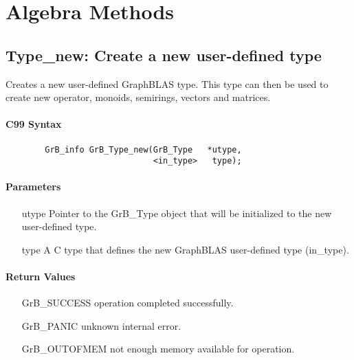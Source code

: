 \section{Algebra Methods}
\label{Sec:AlgebraMethods}



\subsection{{\sf Type\_new}: Create a new user-defined type}

Creates a new user-defined GraphBLAS type. This type can then be used to create new
operator, monoids, semirings, vectors and matrices.

\paragraph{C99 Syntax}

\begin{verbatim}
        GrB_info GrB_Type_new(GrB_Type	 *utype,
                              <in_type>	  type);
\end{verbatim}

\paragraph{Parameters}

\begin{itemize}[leftmargin=1.1in]
	\item[{\sf utype}] 	Pointer to the {\sf GrB\_Type} object that will be initialized to the new user-defined type.
	\item[{\sf type}]	A C type that defines the new GraphBLAS user-defined type ({\sf in\_type}).
\end{itemize}

\paragraph{Return Values}

\begin{itemize}[leftmargin=2.1in]
\item[{\sf GrB\_SUCCESS}]           operation completed successfully.
\item[{\sf GrB\_PANIC}]             unknown internal error.
\item[{\sf GrB\_OUTOFMEM}]          not enough memory available for operation.
\end{itemize}

